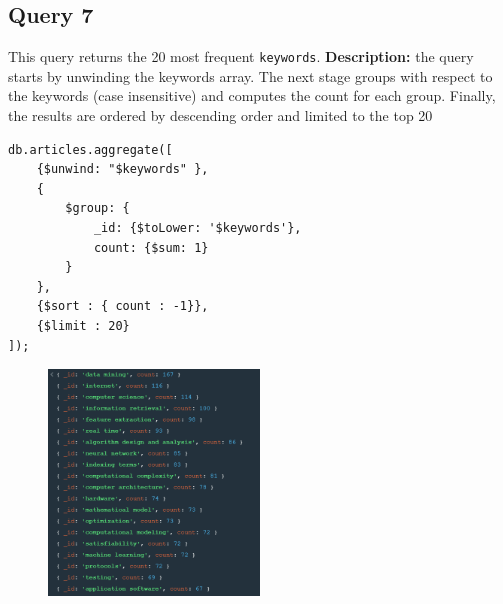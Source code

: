 \documentclass{Configuration_Files/PoliMi3i_thesis}
\begin{document}
\subsection{Query 7}
This query returns the 20 most frequent \verb |keywords|.\newline
\textbf{Description:} the query starts by unwinding the keywords array. The next stage groups with respect to the
keywords (case insensitive) and computes the count for each group. Finally, the results are ordered by descending order
and limited to the top 20
\begin{lstlisting}
db.articles.aggregate([
	{$unwind: "$keywords" },
	{
		$group: {
			_id: {$toLower: '$keywords'},
			count: {$sum: 1}
		}
	},
	{$sort : { count : -1}},
	{$limit : 20}
]);
\end{lstlisting}
\begin{figure}[H]
\centering
\includegraphics[width=0.5\textwidth]{query/mongo_q7.PNG}
\label{fig:query7}
\end{figure}
\end{document}
